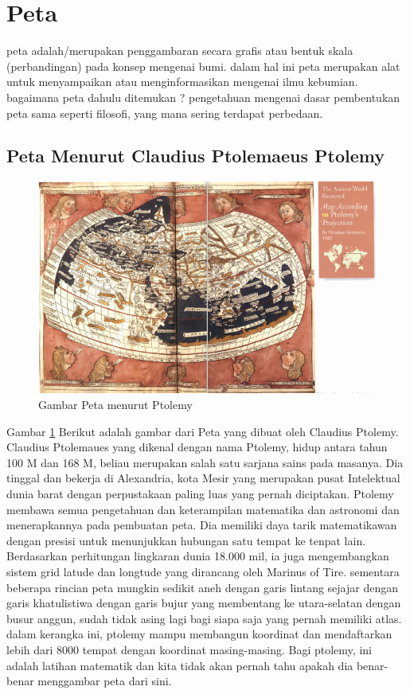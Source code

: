 
\section{Peta}
	peta adalah/merupakan penggambaran secara grafis atau bentuk skala (perbandingan) pada konsep mengenai bumi. dalam hal ini peta merupakan alat untuk menyampaikan atau menginformasikan mengenai ilmu kebumian. bagaimana peta dahulu ditemukan ? pengetahuan mengenai dasar pembentukan peta sama seperti filosofi, yang mana sering terdapat perbedaan.

\subsection{Peta Menurut Claudius Ptolemaeus Ptolemy}
	\begin{figure} [ht]
	\centerline{\includegraphics[width=.5\textwidth]{figures/PetaPtolemy}}
	\caption{Gambar Peta menurut Ptolemy}
	\label{PetaPtolemy}
	\end{figure}
	Gambar \ref {PetaPtolemy} Berikut adalah gambar dari Peta yang dibuat oleh Claudius Ptolemy.
	Claudius Ptolemaues yang dikenal dengan nama Ptolemy, hidup antara tahun 100 M dan 168 M, beliau merupakan salah satu sarjana sains pada masanya. Dia tinggal dan bekerja di Alexandria, kota Mesir yang merupakan pusat Intelektual dunia barat dengan perpustakaan paling luas yang pernah diciptakan. Ptolemy membawa semua pengetahuan dan keterampilan matematika dan astronomi dan menerapkannya pada pembuatan peta. Dia memiliki daya tarik matematikawan dengan presisi untuk menunjukkan hubungan satu tempat ke tenpat lain. Berdasarkan perhitungan lingkaran dunia 18.000 mil, ia juga mengembangkan sistem grid latude dan longtude yang dirancang oleh Marinus of Tire. sementara beberapa rincian peta mungkin sedikit aneh dengan garis lintang sejajar dengan garis khatulistiwa dengan garis bujur yang membentang ke utara-selatan dengan busur anggun, sudah tidak asing lagi bagi siapa saja yang pernah memiliki atlas. dalam kerangka ini, ptolemy mampu membangun koordinat dan mendaftarkan lebih dari 8000 tempat dengan koordinat masing-masing. Bagi ptolemy, ini adalah latihan matematik dan kita tidak akan pernah tahu apakah dia benar-benar menggambar peta dari sini.
